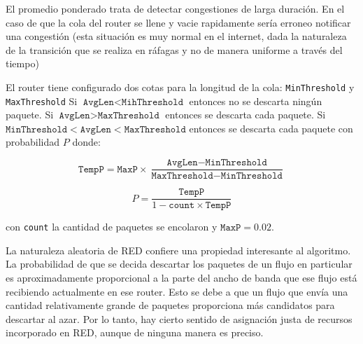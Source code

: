 El promedio ponderado trata de detectar congestiones de larga duración. En el caso de que la cola del router se llene y vacie rapidamente sería erroneo notificar una congestión (esta situación es muy normal en el internet, dada la naturaleza de la transición que se realiza en ráfagas y no de manera uniforme a través del tiempo)

El router tiene configurado dos cotas para la longitud de la cola: \texttt{MinThreshold} y \texttt{MaxThreshold}  Si \(\texttt{AvgLen} < \texttt{MihThreshold}\) entonces no se descarta ningún paquete. Si \(\texttt{AvgLen} > \texttt{MaxThreshold}\) entonces se descarta cada paquete. Si \(\texttt{MinThreshold} < \texttt{AvgLen} < \texttt{MaxThreshold}\) entonces se descarta cada paquete con probabilidad \(P\) donde:

\[
    \texttt{TempP} = \texttt{MaxP}\times\frac{\texttt{AvgLen} - \texttt{MinThreshold}}{\texttt{MaxThreshold} - \texttt{MinThreshold}}
\]

\[
  P = \frac{\texttt{TempP}}{1 - \texttt{count}\times\texttt{TempP}}
\]

con \texttt{count} la cantidad de paquetes se encolaron y \(\texttt{MaxP} = 0.02\).

La naturaleza aleatoria de RED confiere una propiedad interesante al algoritmo. La probabilidad de que se decida descartar los paquetes de un flujo en particular es aproximadamente proporcional a la parte del ancho de banda que ese flujo está recibiendo actualmente en ese router. Esto se debe a que un flujo que envía una cantidad relativamente grande de paquetes proporciona más candidatos para descartar al azar. Por lo tanto, hay cierto sentido de asignación justa de recursos incorporado en RED, aunque de ninguna manera es preciso.
